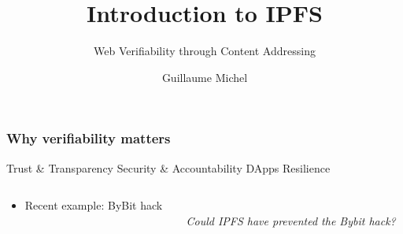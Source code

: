 \documentclass{../shipyard-slide}
\title{Introduction to IPFS}
\subtitle{Web Verifiability through Content Addressing}
\author{Guillaume Michel}
\institute{Interplanetary Shipyard}
\date{\DTMdate{2025-03-07}}
\begin{document}
\frame{\titlepage}


\begin{frame}
  \frametitle{Why verifiability matters}
  \begin{itemize}
    \itemc Trust \& Transparency
    \itemc Security \& Accountability
    \itemc DApps Resilience
  \end{itemize}

  \begin{columns}
  \begin{column}{.63\textwidth}
  \begin{itemize}
    \item[\greencube] Recent example: ByBit hack
  \end{itemize}
  \end{column}
  \begin{column}{.30\textwidth}
    \begin{center}
    \\
    \medskip
    {\footnotesize \textit{Could IPFS have prevented the Bybit hack?}}
  \end{center}
  \end{column}
  \end{columns}

%
\end{frame}
\end{document}
